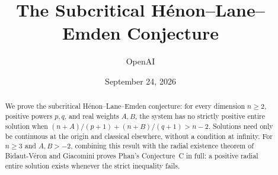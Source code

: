 \documentclass[11pt]{article}
\title{The Subcritical H\'enon--Lane--Emden Conjecture}
\author{OpenAI}
\date{September 24, 2026}
\theoremstyle{definition}
\numberwithin{equation}{section}
\begin{document}
\maketitle
\begin{abstract}
We prove the subcritical H\'enon--Lane--Emden conjecture: for every
dimension $n\ge2$, positive powers $p,q$, and real weights $A,B$, the
system has no strictly positive entire solution when
$(n+A)/(p+1)+(n+B)/(q+1)>n-2$. Solutions need only be continuous at
the origin and classical elsewhere, without a condition at infinity.
For \(n\ge3\) and \(A,B>-2\), combining this result with the radial
existence theorem of Bidaut-V\'eron and Giacomini proves Phan's
Conjecture~C in full: a positive radial entire solution exists whenever
the strict inequality fails.
\end{abstract}
\tableofcontents








\end{document}
